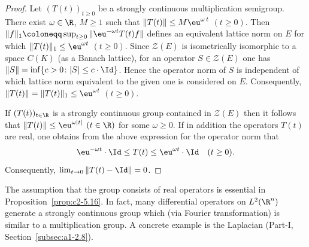 \begin{proof}
Let $(T(t))_{t \geq 0}$ be a strongly continuous multiplication semigroup.
There exist $\omega \in \R$, $M \geq 1$ such that $\|T(t)\| \leq M\eu^{\omega\,t}$ $(t \geq 0)$.
Then 
$\|f\|_1 \coloneqq \sup_{t \geq 0}\|\eu^{-\omega t}T(t)f\|$ 
defines an equivalent lattice norm on $E$ for which 
$\|T(t)\|_1 \leq \eu^{\omega t}$ $(t \geq 0)$.
Since $\mathcal{Z}(E)$ is isometrically isomorphic to a space $C(K)$ (as a Banach lattice), for an operator $S \in \mathcal{Z}(E)$ one has $\|S\| = \inf\{c > 0 \colon |S| \leq c \cdot \Id\}$.
Hence the operator norm of\/ $S$ is independent of which lattice norm equivalent to the given one is considered on $E$.
Consequently, $\|T(t)\| = \|T(t)\|_1 \leq \eu^{\omega t}$ $(t \geq 0)$.

If\/ $(T(t))_{t \in \R}$ is a strongly continuous group contained in $\mathcal{Z}(E)$ then it follows that $\|T(t)\| \leq \eu^{\omega|t|}$ $(t \in \R)$ for some $\omega \geq 0$. 
If in addition the operators $T(t)$ are real, one obtains from the above expression for the operator norm that 
\[
\eu^{- \omega t} \cdot \Id \leq T(t) \leq \eu^{\omega t} \cdot \Id \quad (t \geq 0).
\] 
Consequently, $\lim_{t \to 0}\|T(t) - \Id\| = 0$.
\end{proof}
The assumption that the group consists of real operators is essential in Proposition~\ref{prop:c2-5.16}.
In fact, many differential operators on $L^{2}(\R^n)$ generate a strongly continuous group which (via Fourier transformation) is similar to a multiplication group.
A concrete example is the Laplacian (Part-I, Section~\ref{subsec:a1-2.8}).

